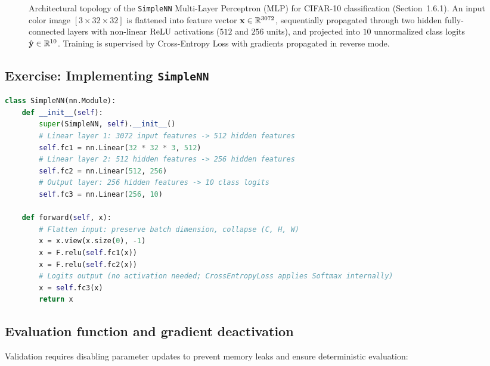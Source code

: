 \documentclass[../labs.tex]{subfiles}
\begin{document}
\begin{figure}[htbp]
{%
}
\caption{Architectural topology of the \texttt{SimpleNN} Multi-Layer Perceptron (MLP) for CIFAR-10 classification (Section~1.6.1). An input color image $[3 \times 32 \times 32]$ is flattened into feature vector $\mathbf{x} \in \mathbb{R}^{3072}$, sequentially propagated through two hidden fully-connected layers with non-linear $\operatorname{\mathrm{ReLU}}$ activations ($512$ and $256$ units), and projected into $10$ unnormalized class logits $\hat{\mathbf{y}} \in \mathbb{R}^{10}$. Training is supervised by Cross-Entropy Loss with gradients propagated in reverse mode.}
\label{fig:lab01_simplenn_architecture}
\end{figure}

\subsection{Exercise: Implementing \texttt{SimpleNN}}

\begin{lstlisting}[language=Python, caption={Verified implementation of \texttt{SimpleNN} architecture (Cell 42).}, label={lst:lab01_simplenn}]
class SimpleNN(nn.Module):
    def __init__(self):
        super(SimpleNN, self).__init__()
        # Linear layer 1: 3072 input features -> 512 hidden features
        self.fc1 = nn.Linear(32 * 32 * 3, 512)
        # Linear layer 2: 512 hidden features -> 256 hidden features
        self.fc2 = nn.Linear(512, 256)
        # Output layer: 256 hidden features -> 10 class logits
        self.fc3 = nn.Linear(256, 10)

    def forward(self, x):
        # Flatten input: preserve batch dimension, collapse (C, H, W)
        x = x.view(x.size(0), -1)
        x = F.relu(self.fc1(x))
        x = F.relu(self.fc2(x))
        # Logits output (no activation needed; CrossEntropyLoss applies Softmax internally)
        x = self.fc3(x)
        return x
\end{lstlisting}

\subsection{Evaluation function and gradient deactivation}
Validation requires disabling parameter updates to prevent memory leaks and ensure deterministic evaluation:
\end{document}
